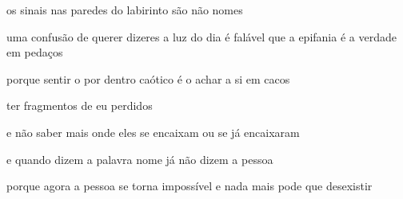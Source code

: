 \begin{poem}
\begin{stanza}
os sinais nas paredes\verseline
do labirinto\verseline
são não nomes
\end{stanza}
\begin{stanza}
uma confusão de querer\verseline
dizeres a luz\verseline
do dia \qquad é falável\verseline
que a epifania\verseline
é a verdade em pedaços
\end{stanza}
\begin{stanza}
porque sentir o por dentro\verseline
caótico\verseline
é o achar a si\verseline
em cacos
\end{stanza}
\begin{stanza}
ter fragmentos de eu\verseline
perdidos
\end{stanza}
\begin{stanza}
e não saber mais\verseline
onde eles se encaixam ou\verseline
se já encaixaram
\end{stanza}
\begin{stanza}
e quando dizem a palavra\verseline
nome \qquad já não dizem\verseline
a pessoa
\end{stanza}
\begin{stanza}
porque agora\verseline
a pessoa se torna\verseline
impossível\verseline
e nada mais pode\verseline
que desexistir
\end{stanza}
\end{poem}
